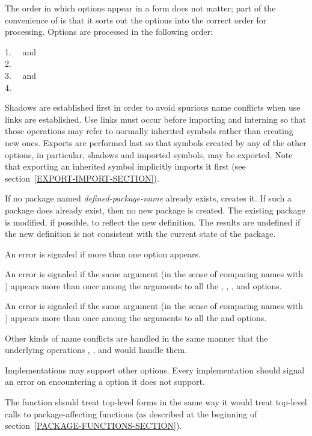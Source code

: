 \begin{new}
\begin{defmac}
The order in which options appear in a  form does not matter;
part of the convenience of  is that it sorts out the options
into the correct order for processing.
Options are processed in the following order:
\begin{tabbing}
1.~~ and  \\
2.~~ \\
3.~~ and  \\
4.~~
\end{tabbing}
Shadows are established first in order to avoid spurious name conflicts
when use links are established.  Use links must occur before importing
and interning so that those operations may refer to normally inherited
symbols rather than creating new ones.  Exports are performed last so that
symbols created by any of the other options, in particular,
shadows and imported symbols, may be exported.  Note that exporting an
inherited symbol implicitly imports it first
(see section~\ref{EXPORT-IMPORT-SECTION}).

If no package named {\it defined-package-name} already exists,
 creates it.  If such a package does already exist,
then no new package is created.  The existing package is
modified, if possible, to reflect the new definition.  The results are
undefined if the new definition is not consistent with the current
state of the package.

An error is signaled if more than one  option appears.

An error is signaled if the same  argument (in the sense
of comparing names with ) appears more than once among
the arguments to all the , ,
, and  options.

An error is signaled if the same  argument (in the sense
of comparing names with ) appears more than once among
the arguments to all the  and  options.

Other kinds of name conflicts are handled in the same manner that
the underlying operations , , and 
would handle them.

Implementations may support other  options.
Every implementation should signal an error on encountering
a  option it does not support.

The function  should treat top-level 
forms in the same way it would treat top-level calls to package-affecting
functions (as described at the beginning of
section~\ref{PACKAGE-FUNCTIONS-SECTION}).


\end{defmac}
\end{new}
